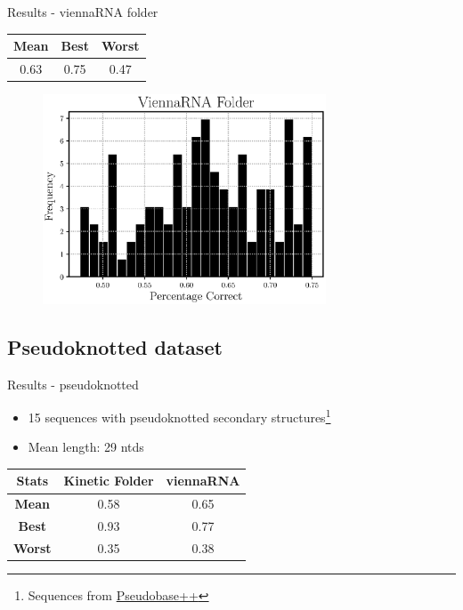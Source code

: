 \documentclass{beamer}
\begin{document}
\begin{frame}{Results - viennaRNA folder}
\begin{table}
\centering
\begin{tabular}{|ccc|}
\hline
{\bf Mean} & {\bf Best} & {\bf Worst}\\
\hline
\hline
0.63 & 0.75 & 0.47\\
\hline
\end{tabular}
\end{table}
\begin{figure}[H]
\centering
\includegraphics[width = 0.75\textwidth]{viennarna.eps}
\end{figure}
\end{frame}

\subsection*{Pseudoknotted dataset}
\begin{frame}{Results - pseudoknotted}
\begin{itemize}
\item 15 sequences with pseudoknotted secondary structures\footnote{Sequences from \href{http://pseudobaseplusplus.utep.edu}{Pseudobase++} }
\item Mean length: 29 ntds
\end{itemize}
\begin{table}
\centering
\begin{tabular}{|ccc|}
\hline
{\bf Stats} & {\bf Kinetic Folder} & {\bf viennaRNA}\\
\hline
\hline
{\bf Mean} & 0.58 & 0.65 \\
{\bf Best} & 0.93 & 0.77 \\
{\bf Worst} & 0.35 & 0.38\\
\hline
\end{tabular}
\end{table}
\end{frame}
\end{document}
